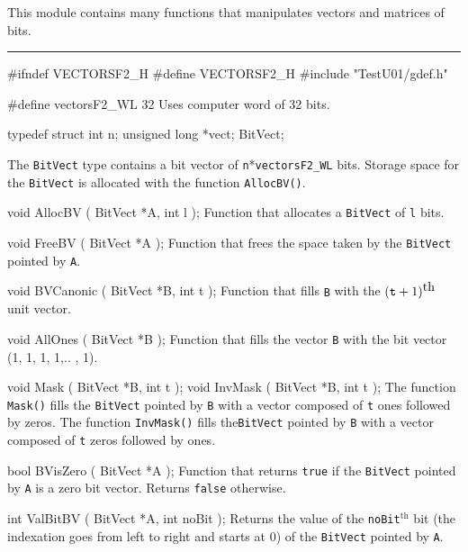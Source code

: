 This module contains many functions that manipulates vectors and
 matrices of bits.

\bigskip\hrule

\code\hide
#ifndef VECTORSF2_H
#define VECTORSF2_H
\endhide
#include "TestU01/gdef.h"
\endcode
\code

#define vectorsF2_WL      32
\endcode
 \tab
Uses computer word of 32 bits.
 \endtab
\bigskip




\code

typedef struct{
   int n;
   unsigned long *vect;
} BitVect;
\endcode

 \tab
The {\tt BitVect} type contains a bit vector of
 {\tt n}*{\tt vectorsF2\_WL} bits.  Storage space for
the {\tt BitVect} is allocated with the function {\tt AllocBV()}.
 \endtab
\code


void AllocBV ( BitVect *A,
               int l
             );
\endcode
 \tab
Function that allocates a {\tt BitVect} of {\tt l} bits.
 \endtab
\code


void FreeBV ( BitVect *A
            );
\endcode
 \tab
Function that frees the space taken by the {\tt BitVect} pointed by {\tt A}.
 \endtab
\code


void BVCanonic ( BitVect *B,
                 int t
               );
\endcode
 \tab
Function that fills {\tt B} with the $({\tt t}+1)^{\mbox{th}}$ unit vector.
 \endtab
\code


void AllOnes ( BitVect *B
             );
\endcode
 \tab
Function that fills the vector {\tt B} with the bit vector (1, 1, 1, 1,.. , 1).
 \endtab
\code


void Mask ( BitVect *B,
            int t
          );
void InvMask ( BitVect *B,
               int t
             );
\endcode
 \tab
The function {\tt Mask()} fills the {\tt BitVect} pointed by {\tt B} with a vector composed of {\tt t} ones followed by zeros.
The function {\tt InvMask()} fills the{\tt BitVect} pointed by {\tt B} with a vector composed of {\tt t} zeros followed by ones.
 \endtab
\code


bool BVisZero ( BitVect *A
                );
\endcode
 \tab
Function that returns {\tt true} if the {\tt BitVect} pointed by {\tt A} is a zero bit vector.  Returns {\tt false} otherwise.
\endtab
\code


int ValBitBV ( BitVect *A,
               int noBit
             );
\endcode
 \tab
Returns the value of the {\tt noBit}$^{\mbox{th}}$ bit (the indexation goes from left to right and starts at 0) of the
{\tt BitVect} pointed by {\tt A}.
 \endtab
\code


